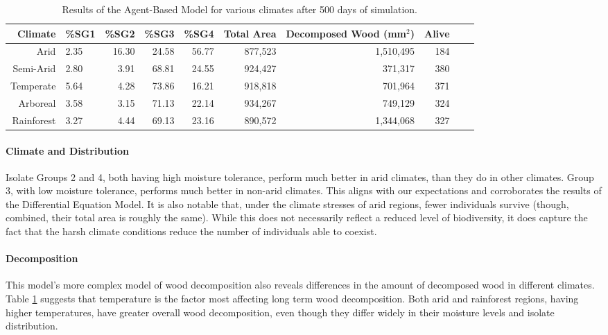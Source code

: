 \documentclass[12pt]{article}
\begin{document}
\begin{table}[ht]
\centering
\begin{adjustbox}{width=1\textwidth}
\small
\begin{tabular}{rlrrrrrrrr}
  \hline
 Climate & \%SG1 & \%SG2& \%SG3 & \%SG4 & Total Area & Decomposed Wood (mm$^2$)& Alive\\
  \hline
Arid & 2.35 & 16.30 & 24.58 & 56.77 &  877,523 & 1,510,495&184 \\ 
  Semi-Arid & 2.80 & 3.91 & 68.81 & 24.55 &  924,427 & 371,317&380\\ 
  Temperate & 5.64 & 4.28 & 73.86 & 16.21 &  918,818 &701,964&371    \\ 
  Arboreal& 3.58 & 3.15 & 71.13 & 22.14 & 934,267 & 749,129 &324 \\ 
  Rainforest & 3.27 & 4.44 & 69.13 & 23.16 & 890,572 & 1,344,068&327 \\ 
\hline
\end{tabular}
\end{adjustbox}
\caption{Results of the Agent-Based Model for various climates after 500 days of simulation.} \label{tab:agent_table}
\end{table} 

\paragraph{Climate and Distribution}
Isolate Groups 2 and 4, both having high moisture tolerance, perform much better in arid climates, than they do in other climates. Group 3, with low moisture tolerance, performs much better in non-arid climates. This aligns with our expectations and corroborates the results of the Differential Equation Model. It is also notable that, under the climate stresses of arid regions, fewer individuals survive (though, combined, their total area is roughly the same). While this does not necessarily reflect a reduced level of biodiversity, it does capture the fact that the harsh climate conditions reduce the number of individuals able to coexist.

\paragraph{Decomposition}
This model's more complex model of wood decomposition also reveals differences in the amount of decomposed wood in different climates. Table \ref{tab:agent_table} suggests that temperature is the factor most affecting long term wood decomposition. Both arid and rainforest regions, having higher temperatures, have greater overall wood decomposition, even though they differ widely in their moisture levels and isolate distribution.
\end{document}
